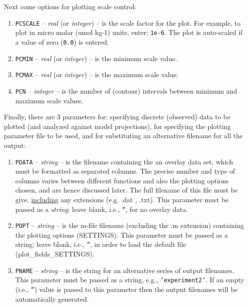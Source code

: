 \documentclass[11pt,fleqn]{book} %
\begin{document}
Next come options for plotting scale control:
\begin{enumerate}
\item \texttt{PCSCALE} -- \textit{real} (or \textit{integer}) -- is the scale factor for the plot. For example, to plot in micro molar (umol kg-1) units, enter; \texttt{1e-6}. The plot is auto-scaled if a value of zero (\texttt{0.0}) is entered.
\item \texttt{PCMIN} -- \textit{real} (or \textit{integer}) -- is the minimum scale value.
\item \texttt{PCMAX} -- \textit{real} (or \textit{integer}) -- is the maximum scale value.
\item \texttt{PCN} -- \textit{integer} -- is the number of (contour) intervals between minimum and maximum scale values.
\end{enumerate}
Finally, there are 3 parameters for: specifying discrete (observed) data to be plotted (and analyzed against model projections), for specifying the plotting parameter file to be used, and for substituting an alternative filename for all the output:
\begin{enumerate}
\item \texttt{PDATA} -- \textit{string} -- is the filename containing the an overlay data set, which must be formatted as separated columns. The precise number and type of columns varies between different functions and also the plotting options chosen, and are hence discussed later. The full filename of this file must be give, \uline{including} any extensions (e.g. \footnotesize\textsf{.dat }\normalsize, \footnotesize\textsf{.txt}\normalsize). This parameter must be passed as a \textit{string}; leave blank, i.e., \texttt{''}, for no overlay data.
\item \texttt{POPT} -- \textit{string} -- is the \footnotesize\textsf{m-file }\normalsize filename (excluding the \footnotesize\textsf{.m }\normalsize extension) containing the plotting options (\footnotesize\textsf{SETTINGS}\normalsize). This parameter must be passed as a string; leave blank, i.e., \texttt{''}, in order to load the default file (\footnotesize\textsf{plot\_fields\_SETTINGS}\normalsize).
\item \texttt{PNAME} -- \textit{string} -- is the string for an alternative series of output filenames. This parameter must be passed as a string, e.g., \texttt{'experiment2'}. If an empty (i.e., \texttt{''}) value is passed to this parameter then the output filenames will be automatically generated.
\end{enumerate}
\end{document}
